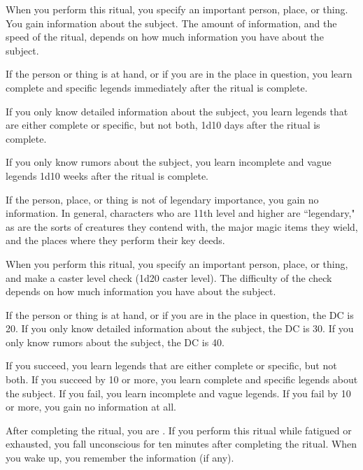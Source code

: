 \spelleffect When you perform this ritual, you specify an important person, place, or thing. You gain information about the subject. The amount of information, and the speed of the ritual, depends on how much information you have about the subject.

If the person or thing is at hand, or if you are in the place in question, you learn complete and specific legends immediately after the ritual is complete.

If you only know detailed information about the subject, you learn legends that are either complete or specific, but not both, 1d10 days after the ritual is complete.

If you only know rumors about the subject, you learn incomplete and vague legends 1d10 weeks after the ritual is complete.

\spellnotes If the person, place, or thing is not of legendary importance, you gain no information. In general, characters who are 11th level and higher are ``legendary," as are the sorts of creatures they contend with, the major magic items they wield, and the places where they perform their key deeds.

\spellline
\spelleffect When you perform this ritual, you specify an important person, place, or thing, and make a caster level check (1d20 \add caster level). The difficulty of the check depends on how much information you have about the subject.

If the person or thing is at hand, or if you are in the place in question, the DC is 20. If you only know detailed information about the subject, the DC is 30. If you only know rumors about the subject, the DC is 40.

If you succeed, you learn legends that are either complete or specific, but not both. If you succeed by 10 or more, you learn complete and specific legends about the subject.  If you fail, you learn incomplete and vague legends. If you fail by 10 or more, you gain no information at all.

After completing the ritual, you are \exhausted. If you perform this ritual while fatigued or exhausted, you fall unconscious for ten minutes after completing the ritual. When you wake up, you remember the information (if any).

